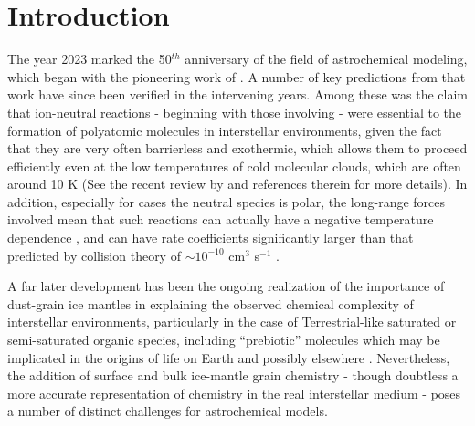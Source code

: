 \documentclass[journal=aesccq,manuscript=draft]{achemso}
\begin{document}
\section{Introduction}

The year 2023 marked the 50$^{th}$ anniversary of the field of astrochemical modeling, which began with the pioneering work of \citet{herbst_formation_1973}. A number of key  predictions from that work have since been verified in the intervening years. Among these was the claim that ion-neutral reactions - beginning with those involving  - were essential to the  formation of polyatomic molecules in interstellar environments, given the fact that they are very often barrierless and exothermic, which allows them to proceed efficiently even at the low temperatures of cold molecular clouds, which are often around 10 K (See the recent review by \citet{ceccarelli_organic_2022} and references therein for more details). In addition, especially for cases the neutral species is polar, the long-range forces involved mean that such reactions can actually have a negative temperature  dependence \citep{woon_quantum_2009}, and can have rate coefficients significantly larger than that predicted by collision theory of $\sim10^{-10}$ cm$^3$ s$^{-1}$ \citep{hammes_principles_1978}. 

A far later development has been the ongoing realization of the importance of dust-grain ice mantles in explaining the observed chemical complexity of interstellar environments, particularly in the case of Terrestrial-like saturated or semi-saturated organic species, including ``prebiotic'' molecules which may be implicated in the origins of life on Earth and possibly elsewhere \citep{ceccarelli_organic_2022}. Nevertheless, the addition of surface and bulk ice-mantle grain chemistry - though doubtless a more accurate representation of chemistry in the real interstellar medium - poses a number of distinct challenges for astrochemical models.
\end{document}
